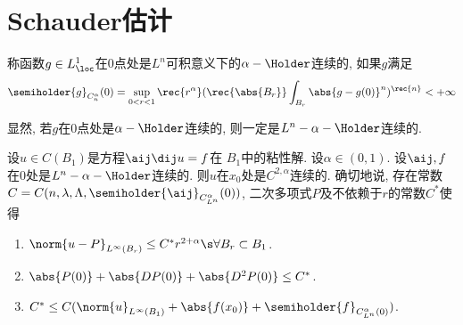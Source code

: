 \section{Schauder估计}
\begin{definition}
    称函数$g \in L^1_{\loc}$在$0$点处是$L^n$可积意义下的$\alpha-\Holder$连续的, 如果$g$满足
    \begin{equation}
        \semiholder{g}_{C^\alpha_n}(0) = \sup_{0<r<1}\rec{r^\alpha}(\rec{\abs{B_r}}\int_{B_r}\abs{g-g(0)}^n)^\rec{n} < +\infty
    \end{equation}
\end{definition}
显然, 若$g$在$0$点处是$\alpha-\Holder$连续的, 则一定是$L^n-\alpha-\Holder$连续的.  
\begin{theorem}
    设$u \in C(B_1)$是方程$\aij \dij u=f$在 $B_1$中的粘性解.  设$\alpha \in (0, 1)$.  设$\aij, f $在$0$处是$L^n-\alpha-\Holder$连续的.  则$u$在$x_0$处是$C^{2, \alpha}$连续的.  确切地说, 存在常数$C=C(n, \lambda, \Lambda, \semiholder{\aij}_{C^\alpha_{L^n}}(0))$, 二次多项式$P$及不依赖于$r$的常数$C^*$使得
    \begin{enumerate}
        \item $\norm{u-P}_{L^\infty(B_r)} \le C^*r^{2+\alpha} \s \forall B_r\subset B_1$.  
        \item $\abs{P(0)}+\abs{DP(0)}+\abs{D^2P(0)} \le C^*$.  
        \item $C^*\le C(\norm{u}_{L^\infty(B_1)}+\abs{f(x_0)}+\semiholder{f}_{C^\alpha_{L^n}(0)})$.  
    \end{enumerate}
\end{theorem}

